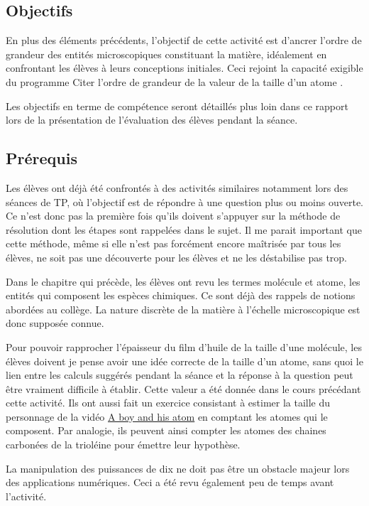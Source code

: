 \documentclass[12pt,a4paper]{article}
\begin{document}
\subsection{Objectifs}

En plus des éléments précédents, l'objectif de cette activité est d'ancrer l'ordre de grandeur des entités microscopiques constituant la matière, idéalement en confrontant les élèves à leurs conceptions initiales.
Ceci rejoint la capacité exigible du programme \og Citer l'ordre de grandeur de la valeur de la taille d'un atome \fg{}.

Les objectifs en terme de compétence seront détaillés plus loin dans ce rapport lors de la présentation de l'évaluation des élèves pendant la séance.

\subsection{Prérequis}

Les élèves ont déjà été confrontés à des activités similaires notamment lors des séances de TP, où l'objectif est de répondre à une question plus ou moins ouverte.
Ce n'est donc pas la première fois qu'ils doivent s'appuyer sur la méthode de résolution dont les étapes sont rappelées dans le sujet.
Il me parait important que cette méthode, même si elle n'est pas forcément encore maîtrisée par tous les élèves, ne soit pas une découverte pour les élèves et ne les déstabilise pas trop.

Dans le chapitre qui précède, les élèves ont revu les termes molécule et atome, les entités qui composent les espèces chimiques.
Ce sont déjà des rappels de notions abordées au collège.
La nature discrète de la matière à l'échelle microscopique est donc supposée connue.

Pour pouvoir rapprocher l'épaisseur du film d'huile de la taille d'une molécule, les élèves doivent je pense avoir une idée correcte de la taille d'un atome, sans quoi le lien entre les calculs suggérés pendant la séance et la réponse à la question peut être vraiment difficile à établir.
Cette valeur a été donnée dans le cours précédant cette activité.
Ils ont aussi fait un exercice consistant à estimer la taille du personnage de la vidéo \href{https://youtu.be/oSCX78-8-q0}{A boy and his atom} en comptant les \og atomes \fg{} qui le composent.
Par analogie, ils peuvent ainsi compter les atomes des chaines carbonées de la trioléine pour émettre leur hypothèse.

La manipulation des puissances de dix ne doit pas être un obstacle majeur lors des applications numériques.
Ceci a été revu également peu de temps avant l'activité.
\end{document}
